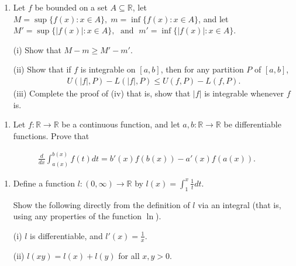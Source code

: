 \documentclass[letterpaper,10pt,english]{jupyterBook}
\begin{document}
\label{\detokenize{Problems:id72}}\begin{enumerate}
%
\setcounter{enumi}{71}
\item {} 
\sphinxAtStartPar
Let \(f\) be bounded on a set \(A\subseteq\mathbb{R}\), let \(M=\sup\{f(x):x\in A\}, \; m=\inf\{f(x):x\in A\}\), and let \(M'=\sup\{|f(x)|:x\in A\}, \; \text{ and } \; m'=\inf\{|f(x)|:x\in A\}\).

\sphinxAtStartPar
(i) Show that \(M-m\geq M'-m'\).

\sphinxAtStartPar
(ii) Show that if \(f\) is integrable on \([a,b]\), then for any partition \(P\) of \([a,b]\),
\begin{equation*}
\begin{split}
    U(|f|,P)-L(|f|,P) \leq U(f,P) - L(f,P).
    \end{split}
\end{equation*}
\sphinxAtStartPar
(iii) Complete the proof of (iv) that is, show that \(|f|\) is integrable whenever \(f\) is.

\end{enumerate}
\label{\detokenize{Problems:id73}}\begin{enumerate}
%
\setcounter{enumi}{72}
\item {} 
\sphinxAtStartPar
Let \(f\colon \mathbb{R} \rightarrow \mathbb{R}\) be a continuous function, and let \(a,b\colon \mathbb{R} \rightarrow \mathbb{R}\) be differentiable functions. Prove that

\end{enumerate}
\begin{equation*}
\begin{split}
\frac{d}{dx} \int_{a(x)}^{b(x)} f(t)dt = b'(x)f(b(x))-a'(x)f(a(x)).
\end{split}
\end{equation*}\label{\detokenize{Problems:id74}}\begin{enumerate}
%
\setcounter{enumi}{73}
\item {} 
\sphinxAtStartPar
Define a function \(l:(0,\infty ) \rightarrow \mathbb{R}\) by \(\displaystyle l(x) = \int_1^x \frac{1}{t}dt\).

Show the following directly from the definition of \(l\) via an integral (that is,  using any properties of the function \(\ln\)).

\sphinxAtStartPar
(i) \(l\) is differentiable, and \(l'(x) = \frac{1}{x}\).

\sphinxAtStartPar
(ii) \(l(xy) = l(x)+l(y)\) for all \(x,y >0\).

\end{enumerate}
\end{document}

